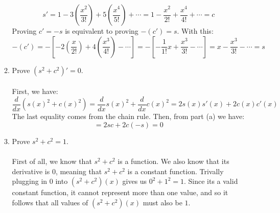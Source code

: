 \begin{enumerate}
\begin{enumerate}
        $$s' = 1 - 3(\frac{x^2}{3!}) + 5(\frac{x^4}{5!}) + \cdots = 1 - \frac{x^2}{2!} + \frac{x^4}{4!} + \cdots = c$$
        Proving $c' = -s$ is equivalent to proving $-(c') = s$. With this:
        $$-(c') = -[-2(\frac{x}{2!}) + 4(\frac{x^3}{4!}) - \cdots] = -[-\frac{1}{1!}x + \frac{x^3}{3!} - \cdots] = x - \frac{x^3}{3!} - \cdots = s$$
      \item Prove $(s^2+c^2)' = 0$.\\\\

        First, we have:
        $$\frac{d}{dx} (s(x)^2 + c(x)^2) = \frac{d}{dx} s(x)^2 + \frac{d}{dx} c(x)^2 = 2s(x)s'(x) + 2c(x)c'(x)$$
        The last equality comes from the chain rule. Then, from part (a) we have:
        $$=2sc + 2c(-s) = 0$$
      \item Prove $s^2 + c^2 = 1$.\\\\

        First of all, we know that $s^2 + c^2$ is a function. We also know that its derivative is $0$, meaning that $s^2 + c^2$ is a constant function. Trivally plugging in $0$ into $(s^2+c^2)(x)$ gives us $0^2 + 1^2 = 1$. Since its a valid constant function, it cannot represent more than one value, and so it follows that all values of $(s^2+c^2)(x)$ must also be $1$.
    \end{enumerate}
\end{enumerate}


